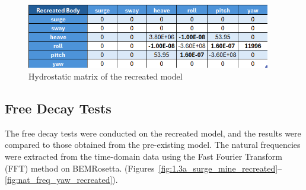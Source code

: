 \documentclass[a4paper, 11pt]{article}
\begin{document}
\begin{figure}[H]
    \centering
    \includegraphics[width=0.95\textwidth]{hyd_st_re.png}
    \caption{\small Hydrostatic matrix of the recreated model}
    \label{fig:hyd_st_re}
\end{figure}

\subsection{Free Decay Tests}
\hspace*{0.5cm}The free decay tests were conducted on the recreated model, and the results were compared to those obtained from the pre-existing model. The natural frequencies were extracted from the time-domain data using the Fast Fourier Transform (FFT) method on BEMRosetta. (Figures~\ref{fig:1.3a_surge_mine_recreated}--\ref{fig:nat_freq_yaw_recreated}). 
\end{document}
